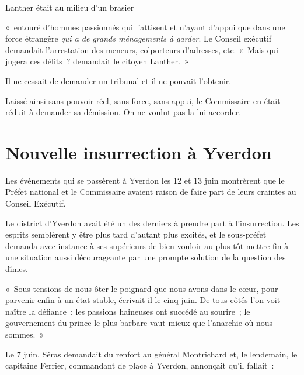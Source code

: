 \documentclass[french,twoside]{book} %
\newenvironment{quoteblock}%
  {\begin{quoting}}
  {\end{quoting}}
\newenvironment{quotebar}{%
    \def\FrameCommand{{\color{rubric!10!}\vrule width 0.5em} \hspace{0.9em}}%
    \def\OuterFrameSep{\itemsep} %
    \MakeFramed {\advance\hsize-\width \FrameRestore}
  }%
  {%
    \endMakeFramed
  }
\renewenvironment{quoteblock}%
  {%
    \savenotes
    \setstretch{0.9}
    \normalfont
    \begin{quotebar}
  }
  {%
    \end{quotebar}
    \spewnotes
  }
\begin{document}
\noindent Lanther était au milieu d’un brasier\par

\begin{quoteblock}
\noindent « entouré d’hommes passionnés qui l’attisent et n’ayant d’appui que dans une force étrangère \emph{qui a de grands ménagements à garder}. Le Conseil exécutif demandait l’arrestation des meneurs, colporteurs d’adresses, etc. « Mais qui jugera ces délits ? demandait le citoyen Lanther. »\end{quoteblock}

\noindent Il ne cessait de demander un tribunal et il ne pouvait l’obtenir.\par
Laissé ainsi sans pouvoir réel, sans force, sans appui, le Commissaire en était réduit à demander sa démission. On ne voulut pas la lui accorder.
\section[Nouvelle insurrection à Yverdon]{Nouvelle insurrection à Yverdon}
\noindent Les événements qui se passèrent à Yverdon les 12 et 13 juin montrèrent que le Préfet national et le Commissaire avaient raison de faire part de leurs craintes au Conseil Exécutif.\par
Le district d’Yverdon avait été un des derniers à prendre part à l’insurrection. Les esprits semblèrent y être plus tard d’autant plus excités, et le sous-préfet demanda avec instance à ses supérieurs de bien vouloir au plus tôt mettre fin à une situation aussi décourageante par une prompte solution de la question des dîmes.\par

\begin{quoteblock}
 \noindent  « Sous-tensions de nous ôter le poignard que nous avons dans le cœur, pour parvenir enfin à un état stable, écrivait-il le cinq juin. De tous côtés l’on voit naître la défiance ; les passions haineuses ont succédé au sourire ; le gouvernement du prince le plus barbare vaut mieux que l’anarchie où nous sommes. »
 \end{quoteblock}

\noindent Le 7 juin, Séras demandait du renfort au général Montrichard et, le lendemain, le capitaine Ferrier, commandant de place à Yverdon, annonçait qu’il fallait :\par
\end{document}
